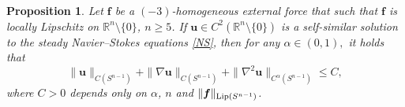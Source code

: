 \documentclass[12pt]{amsart}
\newtheorem{pro}[theorem]{Proposition}
\newcommand{\Bu}{{\boldsymbol{u}}}
\newcommand{\Bf}{{\boldsymbol{f}}}
\begin{document}
\begin{pro}\label{thm:mainest}
	Let  $\Bf$ be a  $(-3)$-homogeneous external force that   such that  $\Bf$ is locally Lipschitz on $\mathbb{R}^n \setminus\{0\}$, $n\geq 5$.
	If $\Bu\in C^2(\mathbb{R}^n \setminus\{0\})$ is a self-similar solution to the steady Navier–Stokes equations \eqref{NS}, 
	then for any $\alpha \in (0,1),$ it holds that
	\begin{equation}\label{eq:C2estimates}
		\|\Bu\|_{C(S^{n-1})} + \|\nabla \Bu\|_{C(S^{n-1})} + \|\nabla^2 \Bu\|_{C^{\alpha}(S^{n-1})}\leq C,
	\end{equation}
	where $C > 0$ depends only on $\alpha$, $n$ and $\|\Bf\|_{\textnormal{Lip}(S^{n-1})}$.
\end{pro}
\end{document}
